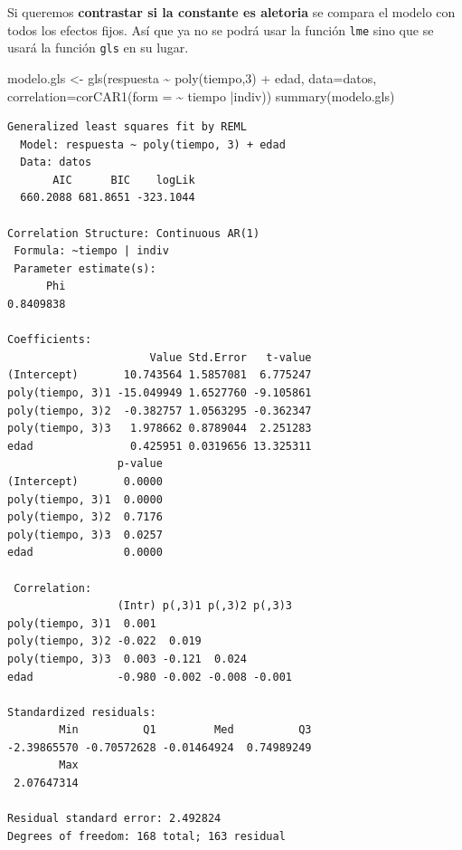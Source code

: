 \documentclass[
]{book}
\newenvironment{Shaded}{\begin{snugshade}}{\end{snugshade}}
\newcommand{\AttributeTok}[1]{\textcolor[rgb]{0.77,0.63,0.00}{#1}}
\newcommand{\DecValTok}[1]{\textcolor[rgb]{0.00,0.00,0.81}{#1}}
\newcommand{\FunctionTok}[1]{\textcolor[rgb]{0.00,0.00,0.00}{#1}}
\newcommand{\NormalTok}[1]{#1}
\newcommand{\OtherTok}[1]{\textcolor[rgb]{0.56,0.35,0.01}{#1}}
\newcommand{\SpecialCharTok}[1]{\textcolor[rgb]{0.00,0.00,0.00}{#1}}
\begin{document}
Si queremos \textbf{contrastar si la constante es aletoria} se compara el modelo con todos los efectos fijos. Así que ya no se podrá usar la función \texttt{lme} sino que se usará la función \texttt{gls} en su lugar.

\begin{Shaded}
\begin{Highlighting}[]
\NormalTok{modelo.gls }\OtherTok{\textless{}{-}} \FunctionTok{gls}\NormalTok{(respuesta }\SpecialCharTok{\textasciitilde{}} \FunctionTok{poly}\NormalTok{(tiempo,}\DecValTok{3}\NormalTok{) }\SpecialCharTok{+}\NormalTok{ edad, }
                  \AttributeTok{data=}\NormalTok{datos, }
                  \AttributeTok{correlation=}\FunctionTok{corCAR1}\NormalTok{(}\AttributeTok{form =} \SpecialCharTok{\textasciitilde{}}\NormalTok{ tiempo }\SpecialCharTok{|}\NormalTok{indiv))}
\FunctionTok{summary}\NormalTok{(modelo.gls)}
\end{Highlighting}
\end{Shaded}

\begin{verbatim}
Generalized least squares fit by REML
  Model: respuesta ~ poly(tiempo, 3) + edad 
  Data: datos 
       AIC      BIC    logLik
  660.2088 681.8651 -323.1044

Correlation Structure: Continuous AR(1)
 Formula: ~tiempo | indiv 
 Parameter estimate(s):
      Phi 
0.8409838 

Coefficients:
                      Value Std.Error   t-value
(Intercept)       10.743564 1.5857081  6.775247
poly(tiempo, 3)1 -15.049949 1.6527760 -9.105861
poly(tiempo, 3)2  -0.382757 1.0563295 -0.362347
poly(tiempo, 3)3   1.978662 0.8789044  2.251283
edad               0.425951 0.0319656 13.325311
                 p-value
(Intercept)       0.0000
poly(tiempo, 3)1  0.0000
poly(tiempo, 3)2  0.7176
poly(tiempo, 3)3  0.0257
edad              0.0000

 Correlation: 
                 (Intr) p(,3)1 p(,3)2 p(,3)3
poly(tiempo, 3)1  0.001                     
poly(tiempo, 3)2 -0.022  0.019              
poly(tiempo, 3)3  0.003 -0.121  0.024       
edad             -0.980 -0.002 -0.008 -0.001

Standardized residuals:
        Min          Q1         Med          Q3 
-2.39865570 -0.70572628 -0.01464924  0.74989249 
        Max 
 2.07647314 

Residual standard error: 2.492824 
Degrees of freedom: 168 total; 163 residual
\end{verbatim}
\end{document}
